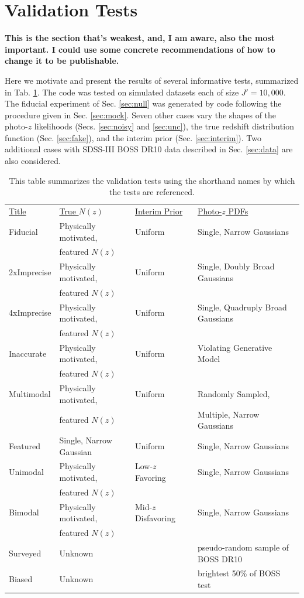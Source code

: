 \documentclass[preprint]{aastex}
\newcommand{\textul}{\underline}
\begin{document}
\section{Validation Tests}
\label{sec:valid}

\textbf{This is the section that's weakest, and, I am aware, also the most 
important.  I could use some concrete recommendations of how to change it to be 
publishable.}

Here we motivate and present the results of several informative tests, 
summarized in Tab. \ref{tab:key}.  The code was tested on simulated datasets 
each of size $J'=10,000$.  The fiducial experiment of Sec. \ref{sec:null} was 
generated by code following the procedure given in Sec. \ref{sec:mock}.  Seven 
other cases vary the shapes of the photo-$z$ likelihoods (Secs. \ref{sec:noisy} 
and \ref{sec:unc}), the true redshift distribution function (Sec. 
\ref{sec:fake}), and the interim prior (Sec. \ref{sec:interim}).  Two 
additional cases with SDSS-III BOSS DR10 data described in Sec. \ref{sec:data} 
are also considered.

\begin{table}
\begin{tabular}{llll}
\textul{Title} & \textul{True $N(z)$} & \textul{Interim Prior} & 
\textul{Photo-$z$ PDFs}\\
Fiducial & Physically motivated, & Uniform & Single, Narrow Gaussians\\
& featured $N(z)$ &&\\
2xImprecise & Physically motivated, & Uniform & Single, Doubly Broad Gaussians\\
& featured $N(z)$ &&\\
4xImprecise & Physically motivated, & Uniform & Single, Quadruply Broad 
Gaussians\\
& featured $N(z)$ &&\\
Inaccurate & Physically motivated, & Uniform & Violating Generative Model\\
& featured $N(z)$ &&\\
Multimodal & Physically motivated, & Uniform & Randomly Sampled,\\
& featured $N(z)$ && Multiple, Narrow Gaussians\\
Featured & Single, Narrow Gaussian & Uniform & Single, Narrow Gaussians\\
Unimodal & Physically motivated, & Low-$z$ Favoring & Single, Narrow Gaussians\\
& featured $N(z)$ &&\\
Bimodal & Physically motivated, & Mid-$z$ Disfavoring & Single, Narrow 
Gaussians\\
& featured $N(z)$ &&\\
Surveyed & Unknown & \citet{Sheldon2012} & pseudo-random sample of BOSS DR10\\
Biased & Unknown & \citet{Sheldon2012} & brightest 50\% of BOSS test
\end{tabular}
\caption{This table summarizes the validation tests using the shorthand names 
by which the tests are referenced.}
\label{tab:key}
\end{table}
\end{document}
